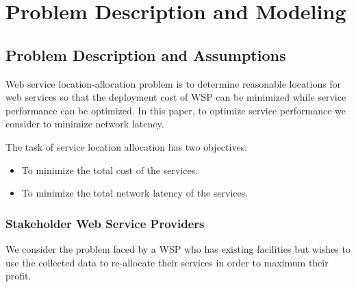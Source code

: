 \documentclass{llncs}
\begin{document}
\section{Problem Description and Modeling}
\label{sec:problem}

\subsection{Problem Description and Assumptions}
Web service location-allocation problem is to determine reasonable locations for web services so that the deployment cost of WSP can be minimized while service performance can be optimized.
In this paper, to optimize service performance we consider to minimize network latency.

The task of service location allocation has two objectives:
\begin{itemize}
	\item To minimize the total cost of the services.
	\item To minimize the total network latency of the services.
\end{itemize}

\subsubsection{Stakeholder Web Service Providers}
We consider the problem faced by a WSP who has existing facilities but wishes to 
use the collected data to re-allocate their services in order to maximum their profit.
\end{document}
